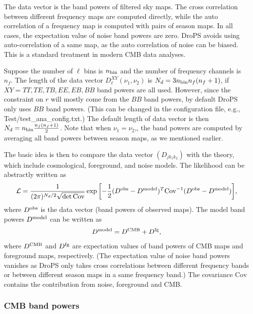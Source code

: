 \documentclass[12pt, a4paper]{ctexart} %
\begin{document}
The data vector is the band powers of filtered sky maps. The cross correlation between different frequency maps are computed directly, while the auto correlation of a frequency map is computed with pairs of season maps. In all cases, the expectation value of noise band powers are zero. DroPS avoids using auto-correlation of a same map, as the auto correlation of noise can be biased. This is a standard treatment in modern CMB data analyses. 

Suppose the number of $\ell$ bins is $n_{\rm bin}$ and the number of frequency channels is $n_f$. The length of the data vector $D^{XY}_\ell(\nu_1,\nu_2)$ is $N_d=3 n_{\rm bin} n_f(n_f+1)$, if $XY = TT, TE, TB, EE, EB, BB$ band powers are all used. However, since the constraint on $r$ will mostly come from the $BB$ band powers, by default DroPS only uses $BB$ band powers. (This can be changed in the configuration file, e.g., Test/test\_ana\_config.txt.) The default length of data vector is then $N_d = n_{\rm bin}\frac{n_f(n_f+1)}{2}$.  Note that when $\nu_1=\nu_2$,, the band powers are computed by averaging all band powers between season maps,  as we mentioned earlier.

The basic idea is then to compare the data vector $(D_{jk_1k_2})$ with the theory, which include cosmological, foreground, and noise models. The likelihood can be abstractly written as
\begin{equation}
  \mathcal{L} = \frac{1}{(2\pi)^{N_d/2}\sqrt{\det\mathrm{Cov}}} \exp{\left[-\frac{1}{2}(D^{\rm obs} - D^{\rm model})^T\mathrm{Cov}^{-1}(D^{\rm obs} - D^{\rm model})\right]},
\end{equation}
where $D^{\rm obs}$ is the data vector (band powers of observed maps). The model band powers $D^{\rm model}$ can be written as
\begin{equation}
  D^{\rm model} = D^{\rm CMB} + D^{\rm fg},
\end{equation}
where $D^{\rm CMB}$ and $D^{\rm fg}$ are expectation values of band powers of CMB maps and foreground maps, respectively. (The expectation value of noise band powers vanishes as DroPS only takes cross correlations between different frequency bands or between different season maps in a same frequency band.) The covariance $\mathrm{Cov}$ contains the contribution from noise, foreground and CMB. 

\subsubsection{CMB band powers}
\end{document}
